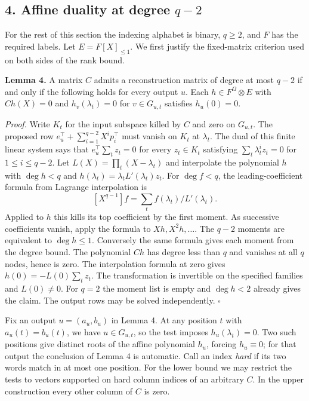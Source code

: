 \documentclass[
  10pt,
]{article}
\begin{document}
\subsection{\texorpdfstring{4. Affine duality at degree
\(q-2\)}{4. Affine duality at degree q-2}}\label{affine-duality-at-degree-q-2}

For the rest of this section the indexing alphabet is binary, \(q\ge2\),
and \(F\) has the required labels. Let \(E=F[X]_{\le1}\). We first
justify the fixed-matrix criterion used on both sides of the rank bound.

\textbf{Lemma 4.} A matrix \(C\) admits a reconstruction matrix of
degree at most \(q-2\) if and only if the following holds for every
output \(u\). Each \(h\in F^\Omega\otimes E\) with \(Ch(X)=0\) and
\(h_v(\lambda_t)=0\) for \(v\in G_{u,t}\) satisfies \(h_u(0)=0\).

\emph{Proof.} Write \(K_t\) for the input subspace killed by \(C\) and
zero on \(G_{u,t}\). The proposed row
\(e_u^\top+\sum_{i=1}^{q-2}X^i p_i^\top\) must vanish on \(K_t\) at
\(\lambda_t\). The dual of this finite linear system says that
\(e_u^\top\sum_t z_t=0\) for every \(z_t\in K_t\) satisfying
\(\sum_t\lambda_t^i z_t=0\) for \(1\le i\le q-2\). Let
\(L(X)=\prod_t(X-\lambda_t)\) and interpolate the polynomial \(h\) with
\(\deg h<q\) and \(h(\lambda_t)=\lambda_tL'(\lambda_t)z_t\). For
\(\deg f<q\), the leading-coefficient formula from Lagrange
interpolation is \[
 [X^{q-1}] f=\sum_t f(\lambda_t)/L'(\lambda_t).
\] Applied to \(h\) this kills its top coefficient by the first moment.
As successive coefficients vanish, apply the formula to
\(Xh,X^2h,\ldots\). The \(q-2\) moments are equivalent to
\(\deg h\le1\). Conversely the same formula gives each moment from the
degree bound. The polynomial \(Ch\) has degree less than \(q\) and
vanishes at all \(q\) nodes, hence is zero. The interpolation formula at
zero gives \(h(0)=-L(0)\sum_t z_t\). The transformation is invertible on
the specified families and \(L(0)\ne0\). For \(q=2\) the moment list is
empty and \(\deg h<2\) already gives the claim. The output rows may be
solved independently. \(\square\)

Fix an output \(u=(a_u,b_u)\) in Lemma 4. At any position \(t\) with
\(a_u(t)=b_u(t)\), we have \(u\in G_{u,t}\), so the test imposes
\(h_u(\lambda_t)=0\). Two such positions give distinct roots of the
affine polynomial \(h_u\), forcing \(h_u\equiv0\); for that output the
conclusion of Lemma 4 is automatic. Call an index \emph{hard} if its
two words match in at most one position. For the lower bound we may
restrict the tests to vectors supported on hard column indices of
an arbitrary \(C\). In the upper construction every other column of
\(C\) is zero.
\end{document}
